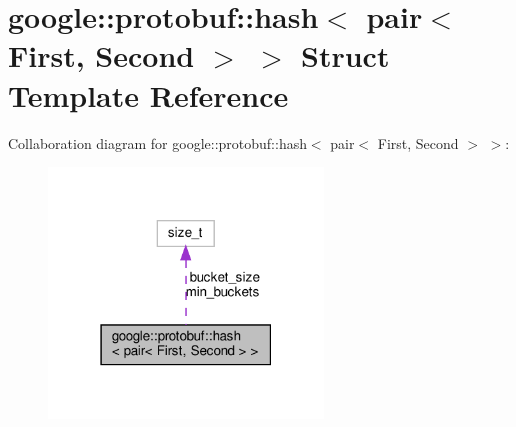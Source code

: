 \hypertarget{structgoogle_1_1protobuf_1_1hash_3_01pair_3_01First_00_01Second_01_4_01_4}{}\section{google\+:\+:protobuf\+:\+:hash$<$ pair$<$ First, Second $>$ $>$ Struct Template Reference}
\label{structgoogle_1_1protobuf_1_1hash_3_01pair_3_01First_00_01Second_01_4_01_4}


Collaboration diagram for google\+:\+:protobuf\+:\+:hash$<$ pair$<$ First, Second $>$ $>$\+:
\nopagebreak
\begin{figure}[H]
\begin{center}
\leavevmode
\includegraphics[width=207pt]{structgoogle_1_1protobuf_1_1hash_3_01pair_3_01First_00_01Second_01_4_01_4__coll__graph}
\end{center}
\end{figure}
